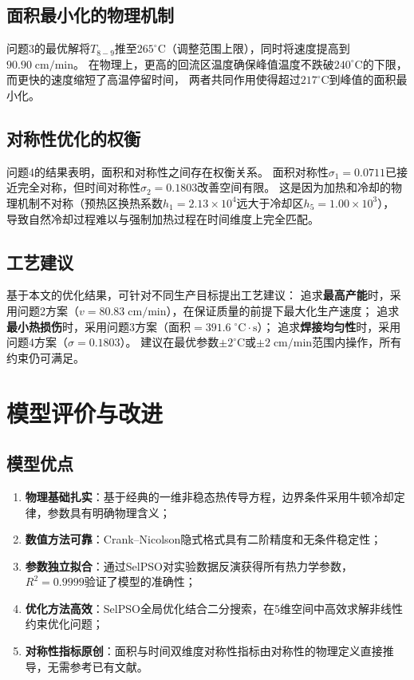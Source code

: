 \documentclass[12pt,a4paper]{ctexart}
\begin{document}
\subsection{面积最小化的物理机制}

问题3的最优解将$T_{8-9}$推至$265^{\circ}\mathrm{C}$（调整范围上限），同时将速度提高到$90.90\;\mathrm{cm/min}$。
在物理上，更高的回流区温度确保峰值温度不跌破$240^{\circ}\mathrm{C}$的下限，而更快的速度缩短了高温停留时间，
两者共同作用使得超过$217^{\circ}\mathrm{C}$到峰值的面积最小化。

\subsection{对称性优化的权衡}

问题4的结果表明，面积和对称性之间存在权衡关系。
面积对称性$\sigma_1=0.0711$已接近完全对称，但时间对称性$\sigma_2=0.1803$改善空间有限。
这是因为加热和冷却的物理机制不对称（预热区换热系数$h_1=2.13\times10^{4}$远大于冷却区$h_5=1.00\times10^{3}$），
导致自然冷却过程难以与强制加热过程在时间维度上完全匹配。

\subsection{工艺建议}

基于本文的优化结果，可针对不同生产目标提出工艺建议：
追求\textbf{最高产能}时，采用问题2方案（$v=80.83\;\mathrm{cm/min}$），在保证质量的前提下最大化生产速度；
追求\textbf{最小热损伤}时，采用问题3方案（面积$=391.6\;^{\circ}\mathrm{C}\!\cdot\!\mathrm{s}$）；
追求\textbf{焊接均匀性}时，采用问题4方案（$\sigma=0.1803$）。
建议在最优参数$\pm2^{\circ}\mathrm{C}$或$\pm2\;\mathrm{cm/min}$范围内操作，所有约束仍可满足。

\section{模型评价与改进}

\subsection{模型优点}

\begin{enumerate}[nosep]
    \item \textbf{物理基础扎实}：基于经典的一维非稳态热传导方程，边界条件采用牛顿冷却定律，参数具有明确物理含义；
    \item \textbf{数值方法可靠}：Crank--Nicolson隐式格式具有二阶精度和无条件稳定性；
    \item \textbf{参数独立拟合}：通过SelPSO对实验数据反演获得所有热力学参数，$R^2=0.9999$验证了模型的准确性；
    \item \textbf{优化方法高效}：SelPSO全局优化结合二分搜索，在5维空间中高效求解非线性约束优化问题；
    \item \textbf{对称性指标原创}：面积与时间双维度对称性指标由对称性的物理定义直接推导，无需参考已有文献。
\end{enumerate}
\end{document}
